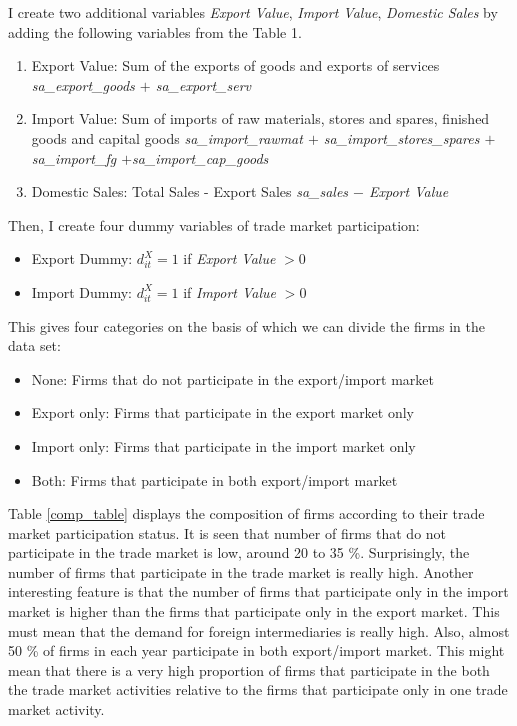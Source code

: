 \documentclass[11pt]{article}
\begin{document}
I create two additional variables \textit{Export Value},
\textit{Import Value},
\textit{Domestic Sales}
by adding the following variables from the Table 1.  
\begin{enumerate}
\item Export Value: Sum of the exports of goods and exports of services \textit{sa\_export\_goods $+$ sa\_export\_serv}
\item Import Value: Sum of imports of raw materials, stores and spares,
  finished goods and capital goods \textit{sa\_import\_rawmat $+$        sa\_import\_stores\_spares
  $+$ sa\_import\_fg            $+$sa\_import\_cap\_goods}
\item Domestic Sales: Total Sales - Export Sales \textit{sa\_sales $-$ Export Value}
\end{enumerate}
Then, I create four dummy variables of trade market participation:
\begin{itemize}
\item Export Dummy: $d_{it}^{X}=1$ if \textit{Export Value} $> 0$
\item Import Dummy: $d_{it}^{X}=1$ if \textit{Import Value} $> 0$
\end{itemize} 
This gives four categories on the basis of which we can divide the
firms in the data set: 
\begin{itemize}
\item None: Firms that do not participate in the export/import market
\item Export only: Firms that participate in the export market only
\item Import only: Firms that participate in the import market only
\item Both: Firms that participate in both export/import market
\end{itemize}
Table \ref{comp_table} displays the composition of firms according to their trade market
participation status. It is seen that number of firms that do not
participate in the trade market is low,  around 20 to 35
\%. Surprisingly, the number of firms that participate in the trade
market is really high. Another interesting feature is that the number
of firms that participate only in the import market is higher than the
firms that participate only in the export market. This must mean that
the demand for foreign intermediaries is really high. Also, almost 50 \% of
firms in each year participate in both export/import market. This
might mean that there is a very high proportion of firms that participate
in the both the trade market activities relative to the firms that
participate only in one trade market activity. 
\begin{center}

\end{center}
\end{document}
